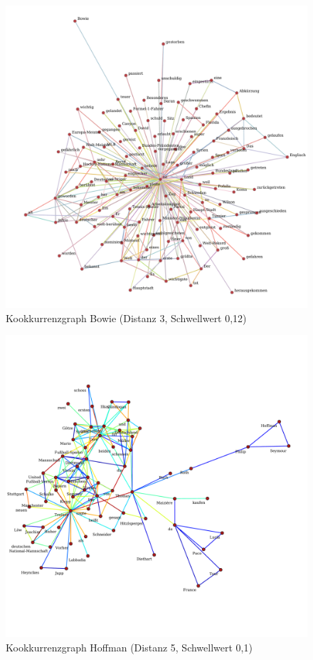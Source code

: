\documentclass[11pt, a4paper]{article}
\begin{document}
\begin{figure}[hp!]
    \centering
        \includegraphics[scale=.4]{../../data/results/longpath_wordgraphs/nl/graph_Bowie.pdf}
    \caption{Kookkurrenzgraph Bowie (Distanz 3, Schwellwert 0,12)}
\end{figure}

\begin{figure}[hp!]
    \centering
        \includegraphics[scale=.4]{../../data/results/longpath_wordgraphs/nl/graph_Hoffman.pdf}
    \caption{Kookkurrenzgraph Hoffman (Distanz 5, Schwellwert 0,1)}
\end{figure}
\end{document}
